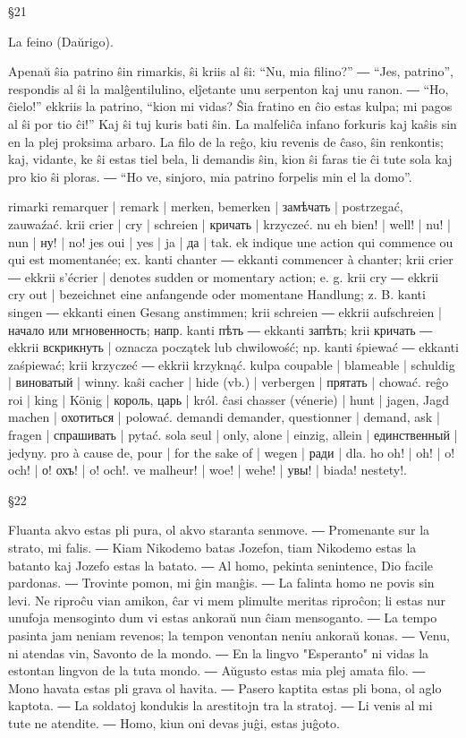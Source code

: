 §21

La feino (Daŭrigo).

Apenaŭ ŝia patrino ŝin rimarkis, ŝi kriis al ŝi: “Nu, mia filino?” ― “Jes, patrino”, respondis al ŝi la malĝentilulino, elĵetante unu serpenton kaj unu ranon. ― “Ho, ĉielo!” ekkriis la patrino, “kion mi vidas? Ŝia fratino en ĉio estas kulpa; mi pagos al ŝi por tio ĉi!” Kaj ŝi tuj kuris bati ŝin. La malfeliĉa infano forkuris kaj kaŝis sin en la plej proksima arbaro. La filo de la reĝo, kiu revenis de ĉaso, ŝin renkontis; kaj, vidante, ke ŝi estas tiel bela, li demandis ŝin, kion ŝi faras tie ĉi tute sola kaj pro kio ŝi ploras. ― “Ho ve, sinjoro, mia patrino forpelis min el la domo”.

rimarki remarquer | remark | merken, bemerken | замѣчать | postrzegać, zauwaźać.
krii crier | cry | schreien | кричать | krzyczeć.
nu eh bien! | well! | nu! | nun | ну! | no!
jes oui | yes | ja | да | tak.
ek indique une action qui commence ou qui est momentanée; ex. kanti chanter ― ekkanti commencer à chanter; krii crier ― ekkrii s’écrier | denotes sudden or momentary action; e. g. krii cry ― ekkrii cry out | bezeichnet eine anfangende oder momentane Handlung; z. B. kanti singen ― ekkanti einen Gesang anstimmen; krii schreien ― ekkrii aufschreien | начало или мгновенность; напр. kanti пѣть ― ekkanti запѣть; krii кричать ― ekkrii вскрикнуть | oznacza początek lub chwilowość; np. kanti śpiewać ― ekkanti zaśpiewać; krii krzyczeć ― ekkrii krzyknąć.
kulpa coupable | blameable | schuldig | виноватый | winny.
kaŝi cacher | hide (vb.) | verbergen | прятать | chować.
reĝo roi | king | König | король, царь | król.
ĉasi chasser (vénerie) | hunt | jagen, Jagd machen | охотиться | polować.
demandi demander, questionner | demand, ask | fragen | спрашивать | pytać.
sola seul | only, alone | einzig, allein | единственный | jedyny.
pro à cause de, pour | for the sake of | wegen | ради | dla.
ho oh! | oh! | o! och! | о! охъ! | o! och!.
ve malheur! | woe! | wehe! | увы! | biada! nestety!.

§22

Fluanta akvo estas pli pura, ol akvo staranta senmove. ― Promenante sur la strato, mi falis. ― Kiam Nikodemo batas Jozefon, tiam Nikodemo estas la batanto kaj Jozefo estas la batato. ― Al homo, pekinta senintence, Dio facile pardonas. ― Trovinte pomon, mi ĝin manĝis. ― La falinta homo ne povis sin levi. Ne riproĉu vian amikon, ĉar vi mem plimulte meritas riproĉon; li estas nur unufoja mensoginto dum vi estas ankoraŭ nun ĉiam mensoganto. ― La tempo pasinta jam neniam revenos; la tempon venontan neniu ankoraŭ konas. ― Venu, ni atendas vin, Savonto de la mondo. ― En la lingvo "Esperanto" ni vidas la estontan lingvon de la tuta mondo. ― Aŭgusto estas mia plej amata filo. ― Mono havata estas pli grava ol havita. ― Pasero kaptita estas pli bona, ol aglo kaptota. ― La soldatoj kondukis la arestitojn tra la stratoj. ― Li venis al mi tute ne atendite. ― Homo, kiun oni devas juĝi, estas juĝoto.

